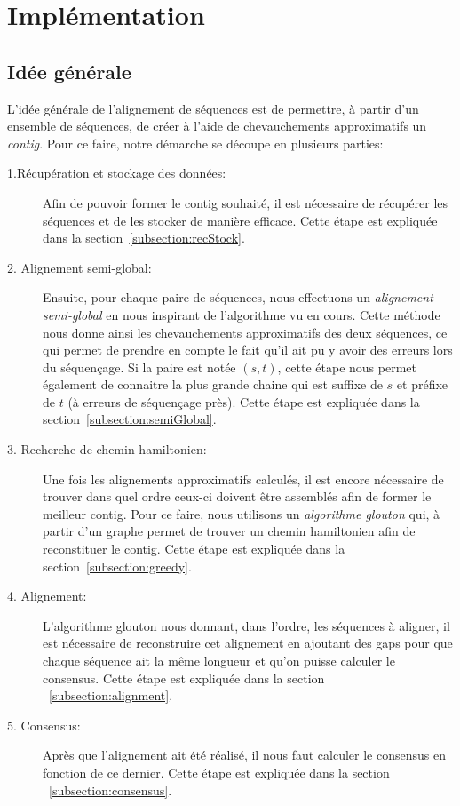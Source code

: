 \section{Implémentation}

\subsection{Idée générale}

	L'idée générale de l'alignement de séquences est de permettre, à partir d'un ensemble de séquences, de créer à l'aide de chevauchements approximatifs un \emph{contig}. Pour ce faire, notre démarche se découpe en plusieurs parties:

	\begin{description}
		\item[1.Récupération et stockage des données:] Afin de pouvoir former le contig souhaité, il est nécessaire de récupérer les séquences et de les stocker de manière efficace. Cette étape est expliquée dans la section~\ref{subsection:recStock}.

		\item[2. Alignement semi-global:] Ensuite, pour chaque paire de séquences,
			nous effectuons un \emph{alignement semi-global} en nous inspirant
			de l'algorithme vu en cours. Cette méthode nous donne ainsi
			les chevauchements approximatifs des deux séquences, ce qui permet de
			prendre en compte le fait qu'il ait pu y avoir des erreurs lors du
			séquençage. Si la paire est notée $(s, t)$, cette étape nous permet également de connaitre la plus
			grande chaine qui est suffixe de $s$ et préfixe de $t$ (à erreurs de séquençage près). Cette étape
			est expliquée dans la section~\ref{subsection:semiGlobal}.

		\item[3. Recherche de chemin hamiltonien:] Une fois les alignements approximatifs
			calculés, il est encore nécessaire de trouver dans quel ordre
			ceux-ci doivent être assemblés afin de former le meilleur contig.
			Pour ce faire, nous utilisons un \emph{algorithme glouton} qui, à
			partir d'un graphe permet de trouver un chemin hamiltonien afin de
			reconstituer le contig. Cette étape est expliquée dans la
			section~\ref{subsection:greedy}.

		\item[4. Alignement:]
			L'algorithme glouton nous donnant, dans l'ordre, les séquences à
			aligner, il est nécessaire de reconstruire cet alignement en
			ajoutant des gaps pour que chaque séquence ait la même longueur et
			qu'on puisse calculer le consensus. Cette étape est expliquée dans
			la section ~\ref{subsection:alignment}.

		\item[5. Consensus:]
			Après que l'alignement ait été réalisé, il nous faut calculer le
			consensus en fonction de ce dernier. Cette étape est expliquée dans
			la section ~\ref{subsection:consensus}.
	\end{description}

